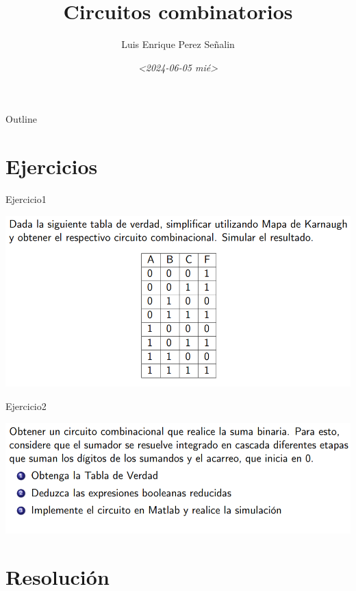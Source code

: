 \documentclass[presentation]{beamer}
\author{Luis Enrique Perez Señalin}
\date{\textit{<2024-06-05 mié>}}
\title{Circuitos combinatorios}
\begin{document}
\maketitle
\begin{frame}{Outline}
\tableofcontents
\end{frame}


\section{Ejercicios}
\label{sec:org5f0dcd4}
\begin{frame}[label={sec:org4e7f694}]{Ejercicio1}
\begin{center}
\includegraphics[width=.9\linewidth]{./ejercicio1.png}
\end{center}
\end{frame}

\begin{frame}[label={sec:org93bc206}]{Ejercicio2}
\begin{center}
\includegraphics[width=.9\linewidth]{./ejercicio2.png}
\end{center}
\end{frame}

\section{Resolución}
\label{sec:orgc9c04f5}
\end{document}
